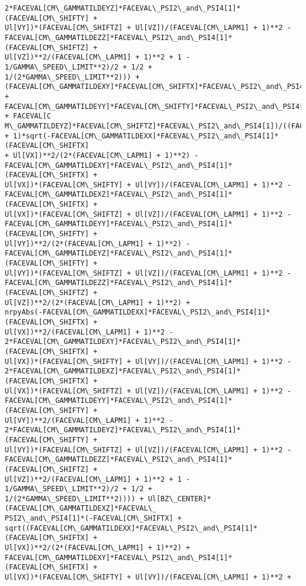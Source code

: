 \documentclass[landscape,letterpaper,10pt,english]{article}
\begin{document}
\begin{Verbatim}[commandchars=\\\{\}]
2*FACEVAL[CM\_GAMMATILDEYZ]*FACEVAL\_PSI2\_and\_PSI4[1]*(FACEVAL[CM\_SHIFTY] +
Ul[VY])*(FACEVAL[CM\_SHIFTZ] + Ul[VZ])/(FACEVAL[CM\_LAPM1] + 1)**2 -
FACEVAL[CM\_GAMMATILDEZZ]*FACEVAL\_PSI2\_and\_PSI4[1]*(FACEVAL[CM\_SHIFTZ] +
Ul[VZ])**2/(FACEVAL[CM\_LAPM1] + 1)**2 + 1 - 1/GAMMA\_SPEED\_LIMIT**2)/2 + 1/2 +
1/(2*GAMMA\_SPEED\_LIMIT**2))) +
(FACEVAL[CM\_GAMMATILDEXY]*FACEVAL[CM\_SHIFTX]*FACEVAL\_PSI2\_and\_PSI4[1] +
FACEVAL[CM\_GAMMATILDEYY]*FACEVAL[CM\_SHIFTY]*FACEVAL\_PSI2\_and\_PSI4[1] + FACEVAL[C
M\_GAMMATILDEYZ]*FACEVAL[CM\_SHIFTZ]*FACEVAL\_PSI2\_and\_PSI4[1])/((FACEVAL[CM\_LAPM1]
+ 1)*sqrt(-FACEVAL[CM\_GAMMATILDEXX]*FACEVAL\_PSI2\_and\_PSI4[1]*(FACEVAL[CM\_SHIFTX]
+ Ul[VX])**2/(2*(FACEVAL[CM\_LAPM1] + 1)**2) -
FACEVAL[CM\_GAMMATILDEXY]*FACEVAL\_PSI2\_and\_PSI4[1]*(FACEVAL[CM\_SHIFTX] +
Ul[VX])*(FACEVAL[CM\_SHIFTY] + Ul[VY])/(FACEVAL[CM\_LAPM1] + 1)**2 -
FACEVAL[CM\_GAMMATILDEXZ]*FACEVAL\_PSI2\_and\_PSI4[1]*(FACEVAL[CM\_SHIFTX] +
Ul[VX])*(FACEVAL[CM\_SHIFTZ] + Ul[VZ])/(FACEVAL[CM\_LAPM1] + 1)**2 -
FACEVAL[CM\_GAMMATILDEYY]*FACEVAL\_PSI2\_and\_PSI4[1]*(FACEVAL[CM\_SHIFTY] +
Ul[VY])**2/(2*(FACEVAL[CM\_LAPM1] + 1)**2) -
FACEVAL[CM\_GAMMATILDEYZ]*FACEVAL\_PSI2\_and\_PSI4[1]*(FACEVAL[CM\_SHIFTY] +
Ul[VY])*(FACEVAL[CM\_SHIFTZ] + Ul[VZ])/(FACEVAL[CM\_LAPM1] + 1)**2 -
FACEVAL[CM\_GAMMATILDEZZ]*FACEVAL\_PSI2\_and\_PSI4[1]*(FACEVAL[CM\_SHIFTZ] +
Ul[VZ])**2/(2*(FACEVAL[CM\_LAPM1] + 1)**2) +
nrpyAbs(-FACEVAL[CM\_GAMMATILDEXX]*FACEVAL\_PSI2\_and\_PSI4[1]*(FACEVAL[CM\_SHIFTX] +
Ul[VX])**2/(FACEVAL[CM\_LAPM1] + 1)**2 -
2*FACEVAL[CM\_GAMMATILDEXY]*FACEVAL\_PSI2\_and\_PSI4[1]*(FACEVAL[CM\_SHIFTX] +
Ul[VX])*(FACEVAL[CM\_SHIFTY] + Ul[VY])/(FACEVAL[CM\_LAPM1] + 1)**2 -
2*FACEVAL[CM\_GAMMATILDEXZ]*FACEVAL\_PSI2\_and\_PSI4[1]*(FACEVAL[CM\_SHIFTX] +
Ul[VX])*(FACEVAL[CM\_SHIFTZ] + Ul[VZ])/(FACEVAL[CM\_LAPM1] + 1)**2 -
FACEVAL[CM\_GAMMATILDEYY]*FACEVAL\_PSI2\_and\_PSI4[1]*(FACEVAL[CM\_SHIFTY] +
Ul[VY])**2/(FACEVAL[CM\_LAPM1] + 1)**2 -
2*FACEVAL[CM\_GAMMATILDEYZ]*FACEVAL\_PSI2\_and\_PSI4[1]*(FACEVAL[CM\_SHIFTY] +
Ul[VY])*(FACEVAL[CM\_SHIFTZ] + Ul[VZ])/(FACEVAL[CM\_LAPM1] + 1)**2 -
FACEVAL[CM\_GAMMATILDEZZ]*FACEVAL\_PSI2\_and\_PSI4[1]*(FACEVAL[CM\_SHIFTZ] +
Ul[VZ])**2/(FACEVAL[CM\_LAPM1] + 1)**2 + 1 - 1/GAMMA\_SPEED\_LIMIT**2)/2 + 1/2 +
1/(2*GAMMA\_SPEED\_LIMIT**2)))) + Ul[BZ\_CENTER]*(FACEVAL[CM\_GAMMATILDEXZ]*FACEVAL\_
PSI2\_and\_PSI4[1]*(-FACEVAL[CM\_SHIFTX] +
sqrt((FACEVAL[CM\_GAMMATILDEXX]*FACEVAL\_PSI2\_and\_PSI4[1]*(FACEVAL[CM\_SHIFTX] +
Ul[VX])**2/(2*(FACEVAL[CM\_LAPM1] + 1)**2) +
FACEVAL[CM\_GAMMATILDEXY]*FACEVAL\_PSI2\_and\_PSI4[1]*(FACEVAL[CM\_SHIFTX] +
Ul[VX])*(FACEVAL[CM\_SHIFTY] + Ul[VY])/(FACEVAL[CM\_LAPM1] + 1)**2 +

\end{Verbatim}
\end{document}
